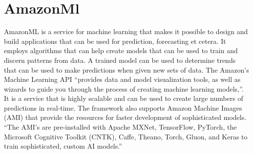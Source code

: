 \section{AmazonMl}

AmazonML is a service for machine learning that makes it possible to design and build applications that can be used for prediction, forecasting et cetera. It employs algorithms that can help create models that can be used to train and discern patterns from data. A trained model can be used to determine trends that can be used to make predictions when given new sets of data. The Amazon’s Machine Learning API “provides data and model visualization tools, as well as wizards to guide you through the process of creating machine learning models,”\cite{Amazon-Machine-Learning-FAQs}. It is a service that is highly scalable and can be used to create large numbers of predictions in real-time. The framework also supports Amazon Machine Images (AMI) that provide the resources for faster development of sophisticated models. “The AMI’s are pre-installed with Apache MXNet, TensorFlow, PyTorch, the Microsoft Cognitive Toolkit (CNTK), Caffe, Theano, Torch, Gluon, and Keras to train sophisticated, custom AI models.”\cite{Machine-Learning-on-AWS}

